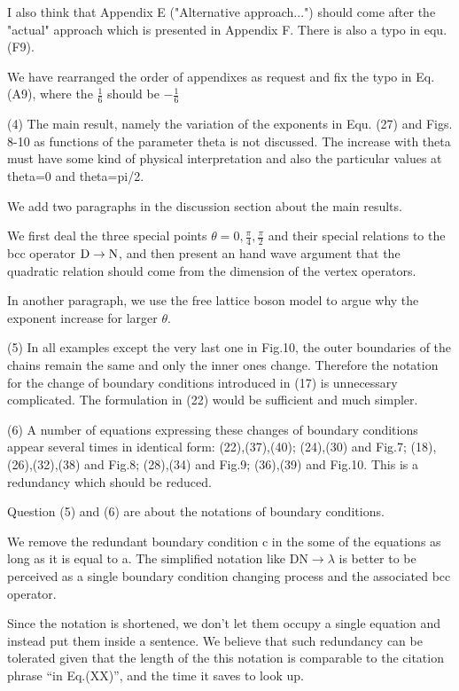 \documentclass{article}
\newcommand{\reply}[1]{{\color{black}#1}}
\begin{document}
I also think that Appendix E ("Alternative approach...") should come after the "actual" approach which is presented in Appendix F. There is also a typo in equ.(F9).

\reply{We have rearranged the order of appendixes as request and fix the typo in Eq.(A9), where the $\frac{1}{6}$ should be $-\frac{1}{6}$}

(4) The main result, namely the variation of the exponents in Equ. (27) and Figs. 8-10 as functions of the parameter theta is not discussed. The increase with theta must have some kind of physical interpretation and also the particular values at theta=0 and theta=pi/2.

\reply{We add two paragraphs in the discussion section about the main results. 

We first deal the three special points $\theta = 0, \frac{\pi}{4}, \frac{\pi}{2}$ and their special relations to the bcc operator ${\rm D} \rightarrow {\rm N}$, and then present an hand wave argument that the quadratic relation should come from the dimension of the vertex operators. 

In another paragraph, we use the free lattice boson model to argue why the exponent increase for larger $\theta$. 
}

(5) In all examples except the very last one in Fig.10, the outer boundaries of the chains remain the same and only the inner ones change. Therefore the notation for the change of boundary conditions introduced in (17) is unnecessary complicated. The formulation in (22) would be sufficient and much simpler.

(6) A number of equations expressing these changes of boundary conditions appear several times in identical form: (22),(37),(40); (24),(30) and Fig.7; (18),(26),(32),(38) and Fig.8; (28),(34) and Fig.9; (36),(39) and Fig.10. This is a redundancy which should be reduced.

\reply{Question (5) and (6) are about the notations of boundary conditions. 

We remove the redundant boundary condition c in the some of the equations as long as it is equal to a. The simplified notation like $\text{DN} \rightarrow \lambda$ is better to be perceived as a single boundary condition changing process and the associated bcc operator. 

Since the notation is shortened, we don’t let them occupy a single equation and instead put them inside a sentence. We believe that such redundancy can be tolerated given that the length of the this notation is comparable to the citation phrase “in Eq.(XX)”, and the time it saves to look up. }
\end{document}
